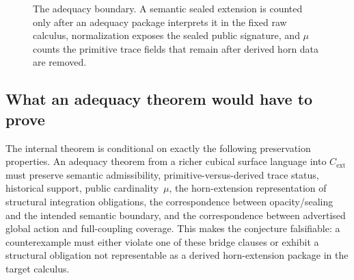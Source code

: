 \documentclass{lmcs}
\newcommand{\Cext}{C_{\mathrm{ext}}}
\begin{document}
\begin{figure}[t]
\centering
{}
\caption{The adequacy boundary. A semantic sealed extension is counted only after an adequacy package interprets it in the fixed raw calculus, normalization exposes the sealed public signature, and $\mu$ counts the primitive trace fields that remain after derived horn data are removed.}
\label{fig:adequacy-flow}
\end{figure}

\subsection{What an adequacy theorem would have to prove}
\label{subsec:adequacy-preservation}

The internal theorem is conditional on exactly the following preservation
properties. An adequacy theorem from a richer cubical surface language into
$\Cext$ must preserve semantic admissibility, primitive-versus-derived trace
status, historical support, public cardinality~$\mu$, the horn-extension
representation of structural integration obligations, the correspondence
between opacity/sealing and the intended semantic boundary, and the
correspondence between advertised global action and full-coupling coverage.
This makes the conjecture falsifiable: a counterexample must either violate
one of these bridge clauses or exhibit a structural obligation not representable
as a derived horn-extension package in the target calculus.
\end{document}
